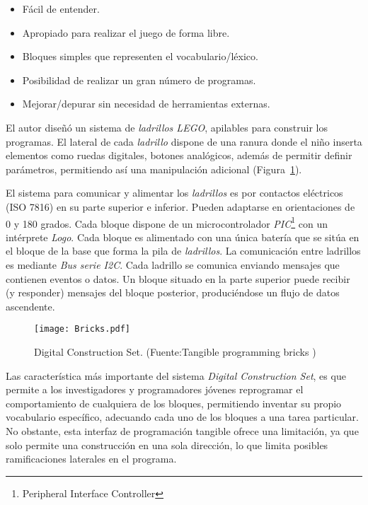 \begin{itemize}
\item Fácil de entender.
\item Apropiado para realizar el juego de forma libre.
\item Bloques simples que representen el vocabulario/léxico.
\item Posibilidad de realizar un gran número de programas.
\item Mejorar/depurar sin necesidad de herramientas externas.
\end{itemize}

El autor diseñó un sistema de \emph{ladrillos LEGO}, apilables para construir los programas. El lateral de cada \emph{ladrillo} dispone de una ranura donde el niño inserta elementos como ruedas digitales, botones analógicos, además de permitir definir parámetros, permitiendo así una manipulación adicional (Figura~\ref{fig:Bricks}).

El sistema para comunicar y alimentar los \emph{ladrillos} es por contactos eléctricos (ISO 7816) en su parte superior e inferior. Pueden adaptarse en orientaciones de 0 y 180 grados.
Cada bloque dispone de un microcontrolador \emph{PIC}\footnote{Peripheral Interface Controller} con un intérprete \emph{Logo}. Cada bloque es alimentado con una única batería que se sitúa en el bloque de la base que forma la pila de \emph{ladrillos}. La comunicación entre ladrillos es mediante \emph{Bus serie I2C}. 
Cada ladrillo se comunica enviando mensajes que contienen eventos o datos. Un bloque situado en la parte superior puede recibir (y responder) mensajes del bloque posterior, produciéndose un flujo de datos ascendente.

\begin{figure}[!h]
\begin{center}
\texttt{[image: Bricks.pdf]}
\caption{Digital Construction Set. (Fuente:Tangible programming bricks \cite{McNerneyBricks})}
\label{fig:Bricks}
\end{center}
\end{figure}

Las característica más importante del sistema \emph{Digital Construction Set}, es que permite a los investigadores y programadores jóvenes reprogramar el comportamiento de cualquiera de los bloques, permitiendo inventar su propio vocabulario específico, adecuando cada uno de los bloques a una tarea particular.
No obstante, esta interfaz de programación tangible ofrece una limitación, ya que solo permite una construcción en una sola dirección, lo que limita posibles ramificaciones laterales en el programa.


